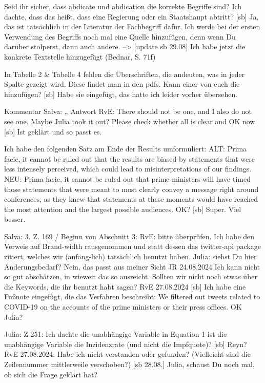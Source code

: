Seid ihr sicher, dass abdicate und abdication die korrekte Begriffe sind? Ich dachte, dass das heißt, dass eine Regierung oder ein Staatshaupt abtritt?
[sb] Ja, das ist tatsächlich in der Literatur der Fachbegriff dafür. Ich werde bei der ersten Verwendung des Begriffs noch mal eine Quelle hinzufügen, denn wenn Du darüber stolperst, dann auch andere. --> [update sb 29.08] Ich habe jetzt die konkrete Textstelle hinzugefügt (Bednar, S. 71f)


In Tabelle 2 & Tabelle 4 fehlen die Überschriften, die andeuten, was in jeder Spalte gezeigt wird. Diese findet man in den pdfs. Kann einer von euch die hinzufügen?
[sb] Habe sie eingefügt, das hatte ich leider vorher übersehen. 


Kommentar Salva: „%
Antwort RvE: There should not be one, and I also do not see one. Maybe Julia took it out? Please check whether all is clear and OK now.
[sb] Ist geklärt und so passt es. 

Ich habe den folgenden Satz am Ende der Results umformuliert:
ALT: Prima facie, it cannot be ruled out that the results are biased by statements that were less intensely perceived, which could lead to misinterpretations of our findings.
NEU: Prima facie, it cannot be ruled out that prime ministers will have timed those statements that were meant to most clearly convey a message right around conferences, as they knew that statements at these moments would have reached the most attention and the largest possible audiences.
OK?
[sb] Super. Viel besser.

Salva: 3. Z. 169 / Beginn von Abschnitt 3: RvE: bitte überprüfen. Ich habe den Verweis auf Brand-width rausgenommen und statt dessen das twitter-api package zitiert, welches wir (anfäng-lich) tatsächlich benutzt haben. Julia: siehst Du hier Änderungsbedarf?
Nein, das passt aus meiner Sicht JR 24.08.2024
Ich kann nicht so gut abschätzen, in wieweit das so ausreicht. Sollten wir nicht noch etwas über die Keywords, die ihr benutzt habt sagen? RvE 27.08.2024
[sb] Ich habe eine Fußnote eingefügt, die das Verfahren beschreibt: We filtered out tweets related to COVID-19 on the accounts of the prime ministers or their press offices. OK Julia?


Julia: Z 251: Ich dachte die unabhängige Variable in Equation 1 ist die unabhängige Variable die Inzidenzrate (und nicht die Impfquote)?
[sb] Reyn?
RvE 27.08.2024: Habe ich nicht verstanden oder gefunden? (Vielleicht sind die Zeilennummer mittlerweile verschoben?)
[sb 28.08.] Julia, schaust Du noch mal, ob sich die Frage geklärt hat?

